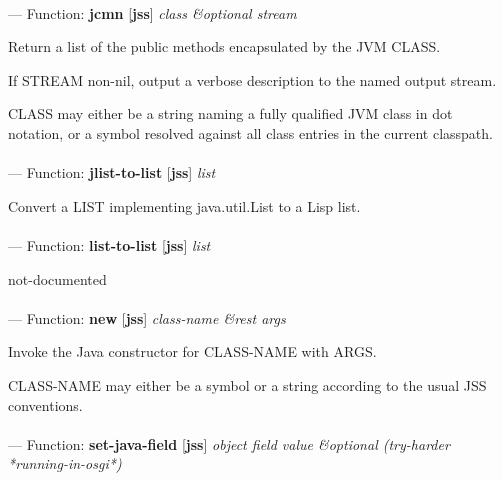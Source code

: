 \paragraph{}
\label{JSS:JCMN}
--- Function: \textbf{jcmn} [\textbf{jss}] \textit{class \&optional stream}

\begin{adjustwidth}{5em}{5em}
Return a list of the public methods encapsulated by the JVM CLASS.

If STREAM non-nil, output a verbose description to the named output stream.

CLASS may either be a string naming a fully qualified JVM class in dot
notation, or a symbol resolved against all class entries in the
current classpath.
\end{adjustwidth}

\paragraph{}
\label{JSS:JLIST-TO-LIST}
--- Function: \textbf{jlist-to-list} [\textbf{jss}] \textit{list}

\begin{adjustwidth}{5em}{5em}
Convert a LIST implementing java.util.List to a Lisp list.
\end{adjustwidth}

\paragraph{}
\label{JSS:LIST-TO-LIST}
--- Function: \textbf{list-to-list} [\textbf{jss}] \textit{list}

\begin{adjustwidth}{5em}{5em}
not-documented
\end{adjustwidth}

\paragraph{}
\label{JSS:NEW}
--- Function: \textbf{new} [\textbf{jss}] \textit{class-name \&rest args}

\begin{adjustwidth}{5em}{5em}
Invoke the Java constructor for CLASS-NAME with ARGS.

CLASS-NAME may either be a symbol or a string according to the usual JSS conventions.
\end{adjustwidth}

\paragraph{}
\label{JSS:SET-JAVA-FIELD}
--- Function: \textbf{set-java-field} [\textbf{jss}] \textit{object field value \&optional (try-harder *running-in-osgi*)}

